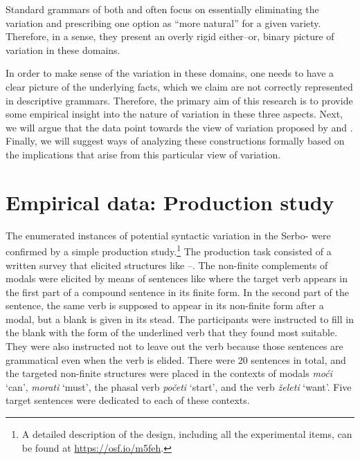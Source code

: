 \documentclass[output=paper,modfonts,newtxmath,hidelinks,]{langscibook}
\begin{document}
\ea \label{7:ex4}
	\z
\z

\noindent Standard grammars of both  and  often focus on essentially eliminating the variation and prescribing one option as ``more natural'' for a given variety. Therefore, in a sense, they present an overly rigid either--or, binary picture of variation in these domains.

In order to make sense of the variation in these domains, one needs to have a clear picture of the underlying facts, which we claim are not correctly represented in descriptive grammars. Therefore, the primary aim of this research is to provide some empirical insight into the nature of variation in these three aspects. Next, we will argue that the data point towards the view of variation proposed by  \citet{AdgerTrousdale2007} and \citet{AdgerSmith2005}. Finally, we will suggest ways of analyzing these constructions formally based on the implications that arise from this particular view of variation.

\section{Empirical data: Production study}\label{7:s2}

The enumerated instances of potential syntactic variation in the Serbo-  were confirmed by a simple production study.\footnote{\label{7:fn1}A detailed description of the design, including all the experimental items, can be found at \url{https://osf.io/m5feh}.} The production task consisted of a written survey that elicited structures like --. The non-finite complements of modals were elicited by means of sentences like  where the target verb appears in the first part of a compound sentence in its finite form. In the second part of the sentence, the same verb is supposed to appear in its non-finite form after a modal, but a blank is given in its stead. The participants were instructed to fill in the blank with the form of the underlined verb that they found most suitable. They were also instructed not to leave out the verb because those sentences are grammatical even when the verb is elided. There were 20 sentences in total, and the targeted non-finite structures were placed in the contexts of modals \textit{moći} `can', \textit{morati} `must', the phasal verb \textit{početi} `start', and the verb \textit{želeti} `want'. Five target sentences were dedicated to each of these contexts.\largerpage[2]
\end{document}
